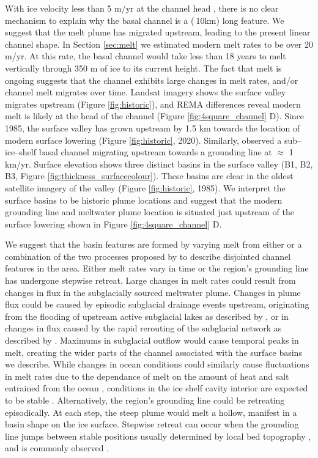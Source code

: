 With ice velocity less than 5 m/yr at the channel head \citep{rignot2017measures},  there is no clear mechanism to explain why the basal channel is a ($\>$10km) long feature. We suggest that the melt plume has migrated upstream, leading to the present linear channel shape.  
In Section \ref{sec:melt} we estimated modern melt rates to be over 20 m/yr. At this rate, the basal channel would take less than 18 years to melt vertically through 350 m of ice to its current height.  The fact that melt is ongoing suggests that the channel exhibits large changes in melt rates, and/or channel melt migrates over time. Landsat imagery shows the surface valley migrates upstream (Figure \ref{fig:historic}), and REMA differences reveal modern melt is likely at the head of the channel (Figure \ref{fig:4square_channel} D).   Since 1985, the surface valley has grown upstream by 1.5 km towards the location of modern surface lowering (Figure \ref{fig:historic}, 2020).
Similarly, \cite{chartrand2020basal} observed a sub--ice--shelf basal channel migrating upstream towards a grounding line at $\approx$ 1 km/yr.
Surface elevation shows three distinct basins in the surface valley (B1, B2, B3, Figure \ref{fig:thickness_surfacecolour}). These basins are clear in the oldest satellite imagery of the valley (Figure \ref{fig:historic}, 1985). We interpret the surface basins to be historic plume locations and suggest that the modern grounding line and meltwater plume location is situated just upstream of the surface lowering shown in Figure \ref{fig:4square_channel} D. 

We suggest that the basin features are formed by varying melt from either or a combination of the two processes proposed by \cite{horgan2017poststagnation} to describe disjointed channel features in the area. Either melt rates vary in time or the region's grounding line has undergone stepwise retreat.
Large changes in melt rates could result from changes in flux in the subglacially sourced meltwater plume. Changes in plume flux could be caused by episodic subglacial drainage events upstream, originating from the flooding of upstream active subglacial lakes as described by \cite{kim2016active}, or in changes in flux caused by the rapid rerouting of the subglacial network as described by \cite{carter2012supply}. Maximums in subglacial outflow would cause temporal peaks in melt, creating the wider parts of the channel associated with the surface basins we describe. 
While changes in ocean conditions could similarly cause fluctuations in melt rates due to the dependance of melt on the amount of heat and salt entrained from the ocean \citep{jenkins1991one}, conditions in the ice shelf cavity interior are expected to be stable \citep{stevens2020ocean}. 
Alternatively, the region's grounding line could be retreating episodically. At each step, the steep plume would melt a hollow, manifest in a basin shape on the ice surface.
 Stepwise retreat can occur when the grounding line jumps between stable positions usually determined by local bed topography \citep{haseloff2018effect}, and is commonly observed \cite [e.g.][] {jakobsson2012ice}.  
 

